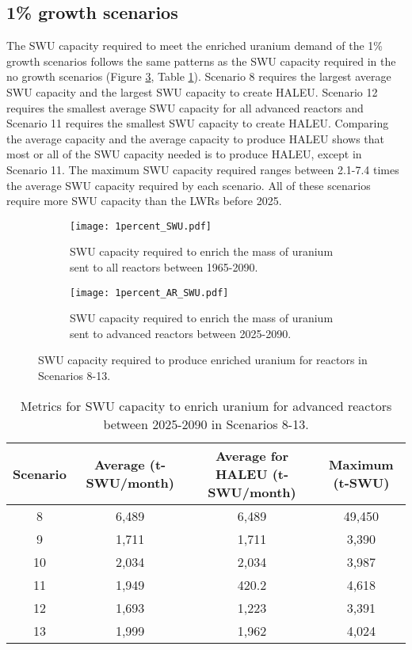 \subsection{1\% growth scenarios}
The \gls{SWU} capacity required to meet the enriched uranium demand of 
the 1\% growth scenarios 
follows the same patterns as the \gls{SWU} capacity required in the no 
growth scenarios (Figure \ref{fig:1percent_swu}, Table \ref{tab:1percent_swu}).
Scenario 8 requires the largest average \gls{SWU} 
capacity and the largest \gls{SWU} capacity to create \gls{HALEU}. 
Scenario 12 requires the smallest average \gls{SWU} capacity for all 
advanced reactors and Scenario 11 requires the smallest \gls{SWU} capacity 
to create \gls{HALEU}. Comparing 
the average capacity and the average capacity to produce \gls{HALEU} 
shows that most or all of the \gls{SWU} capacity needed is to produce 
\gls{HALEU}, except in Scenario 11. The 
maximum \gls{SWU} capacity required ranges between 2.1-7.4 times 
the average \gls{SWU} capacity required by each scenario. All of these 
scenarios require more \gls{SWU} capacity than the \glspl{LWR} before 
2025. 

\begin{figure}
    \centering
    \begin{subfigure}[b]{0.45\textwidth}
        \centering
        \texttt{[image: 1percent\_SWU.pdf]}
        \caption{\gls{SWU} capacity required to enrich the mass of 
        uranium sent to all reactors between 1965-2090.}
        \label{fig:1percent_all_SWU}
    \end{subfigure}
    \hfill
    \begin{subfigure}[b]{0.45\textwidth}
        \centering
        \texttt{[image: 1percent\_AR\_SWU.pdf]}
        \caption{\gls{SWU} capacity required to enrich the mass of 
        uranium sent to advanced reactors between 2025-2090.}
        \label{fig:1percent_AR_SWU}
    \end{subfigure}
       \caption{\gls{SWU} capacity required to produce enriched uranium 
       for reactors in Scenarios 8-13.}
       \label{fig:1percent_swu}
\end{figure}

\begin{table}
    \centering 
    \caption{Metrics for \gls{SWU} capacity to enrich uranium for 
    advanced reactors between 2025-2090 in Scenarios 8-13.}
    \label{tab:1percent_swu}
    \begin{tabular}{c c c c}
        \hline
        Scenario & Average (t-SWU/month) & Average  
        for \gls{HALEU} (t-SWU/month) & Maximum (t-SWU)\\\hline
        8 & 6,489 & 6,489 & 49,450 \\
        9 & 1,711 & 1,711 & 3,390 \\
        10 & 2,034 & 2,034 & 3,987\\
        11 & 1,949 & 420.2 & 4,618 \\
        12 & 1,693 & 1,223 & 3,391\\
        13 & 1,999 & 1,962 & 4,024\\
        \hline
    \end{tabular}
\end{table}

